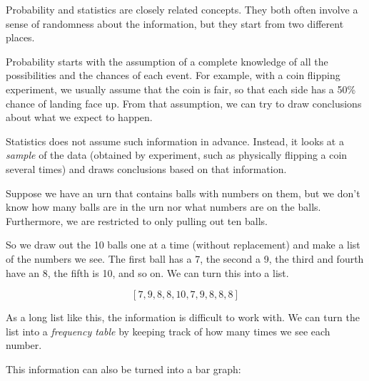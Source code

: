 \documentclass{ximera}
\begin{document}
Probability and statistics are closely related concepts. They both often involve a sense of randomness about the information, but they start from two different places.

Probability starts with the assumption of a complete knowledge of all the possibilities and the chances of each event. For example, with a coin flipping experiment, we usually assume that the coin is fair, so that each side has a 50\% chance of landing face up. From that assumption, we can try to draw conclusions about what we expect to happen.

Statistics does not assume such information in advance. Instead, it looks at a \emph{sample} of the data (obtained by experiment, such as physically flipping a coin several times) and draws conclusions based on that information.

Suppose we have an urn that contains balls with numbers on them, but we don't know how many balls are in the urn nor what numbers are on the balls. Furthermore, we are restricted to only pulling out ten balls.

So we draw out the 10 balls one at a time (without replacement) and make a list of the numbers we see. The first ball has a 7, the second a 9, the third and fourth have an 8, the fifth is 10, and so on. We can turn this into a list.

\[ [ 7, 9, 8, 8, 10, 7, 9, 8, 8, 8 ] \]

As a long list like this, the information is difficult to work with. We can turn the list into a \emph{frequency table} by keeping track of how many times we see each number.

\begin{image}
\end{image}

This information can also be turned into a bar graph:

\begin{image}
\end{image}
\end{document}
